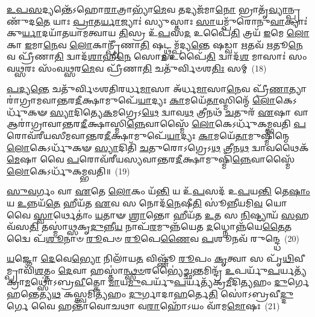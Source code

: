 \-\ul{𑌉}\-\-\ul{𑌪}\-\-\ul{𑌸}\-𑌦𑍍𑌯𑌨𑍍𑌤𑍇᳴\-𑌽𑌹𑍋\-\ul{𑌰𑌾}\-𑌤𑍍𑌰𑌾𑌭𑍍𑌯𑌾᳴\-\ul{𑌮𑍇}\-𑌵 𑌤𑌦𑍍𑌯𑌜᳴𑌮𑌾\-\ul{𑌨𑍋} 𑌭𑍍𑌰𑌾𑌤𑍃᳴\-\ul{𑌵𑍍𑌯𑌾}\-𑌨𑍍𑌪𑍍𑌰 𑌣𑍁᳴𑌦\-\ul{𑌤𑍇} 𑌯𑌾𑌃 \ul{𑌪𑍍𑌰𑌾}\-𑌤\-\ul{𑌰𑍍𑌯𑌾}\-𑌜𑍍𑌯𑌾𑌃॑ 𑌸𑍍𑌯𑍁𑌸𑍍𑌤𑌾𑌃 \ul{𑌸𑌾}\-𑌯𑌮𑍍𑌪𑍁᳴𑌰𑍋𑌨𑍁\-\ul{𑌵𑌾}\-𑌕𑍍𑌯𑌾𑌃॑ 𑌕𑍁\-\ul{𑌰𑍍𑌯𑌾}\-𑌦𑌯𑌾᳴𑌤𑌯𑌾𑌮𑌤𑍍𑌵𑌾𑌯 \ul{𑌤𑌿}\-𑌸𑍍𑌰 𑌉᳴\-\ul{𑌪}\-𑌸\-\ul{𑌦} 𑌉𑌪𑍈᳴\-\ul{𑌤𑌿} 𑌤𑍍𑌰𑌯᳴ \ul{𑌇}\-𑌮𑍇 \ul{𑌲𑍋}\-𑌕𑌾 \ul{𑌇}\-𑌮𑌾\-\ul{𑌨𑍇}\-𑌵 \ul{𑌲𑍋}\-𑌕𑌾𑌨𑍍𑌪𑍍𑌰𑍀᳴𑌣𑌾\-\ul{𑌤𑌿} 𑌷𑌟𑍍𑌥𑍍𑌸𑌮𑍍𑌪᳴𑌦𑍍𑌯\-\ul{𑌨𑍍𑌤𑍇} 𑌷𑌡𑍍𑌵𑌾 \ul{𑌋}\-𑌤𑌵᳴ \ul{𑌋}\-𑌤𑍂\-\ul{𑌨𑍇}\-𑌵 𑌪𑍍𑌰𑍀᳴𑌣𑌾\-\ul{𑌤𑌿} 𑌦𑍍𑌵𑌾𑌦᳴\-\ul{𑌶𑌾}\-𑌹𑍀\-\ul{𑌨𑍇} 𑌸𑍋\-\ul{𑌮} 𑌉𑌪𑍈᳴\-\ul{𑌤𑌿} 𑌦𑍍𑌵𑌾𑌦᳴\-\ul{𑌶} 𑌮𑌾𑌸𑌾𑌃॑ 𑌸𑌂𑌵\-\ul{𑌥𑍍𑌸}\-𑌰𑌃 𑌸𑌂᳴𑌵\-\ul{𑌥𑍍𑌸}\-𑌰\-\ul{𑌮𑍇}\-𑌵 𑌪𑍍𑌰𑍀᳴𑌣𑌾\-\ul{𑌤𑌿} 𑌚𑌤𑍁᳴𑌰𑍍𑌵𑌿𑍞𑌶\-\ul{𑌤𑌿𑌃} 𑌸𑌮𑍍~(18)

\-\ul{𑌪}\-\-\ul{𑌦𑍍𑌯}\-\-\ul{𑌨𑍍𑌤𑍇} 𑌚𑌤𑍁᳴𑌰𑍍𑌵𑌿𑍞𑌶𑌤𑌿𑌰𑌰𑍍𑌧\-\ul{𑌮𑌾}\-𑌸𑌾 𑌅᳴𑌰𑍍𑌧\-\ul{𑌮𑌾}\-𑌸𑌾\-\ul{𑌨𑍇}\-𑌵 𑌪𑍍𑌰𑍀᳴\-\ul{𑌣𑌾}\-𑌤𑍍𑌯𑌾𑌰𑌾॑𑌗𑍍𑌰𑌾𑌮𑌵𑌾𑌨𑍍𑌤𑌰\-\ul{𑌦𑍀}\-𑌕𑍍𑌷𑌾𑌮𑍁𑌪𑍇᳴\-\ul{𑌯𑌾}\-𑌦𑍍𑌯𑌃 \ul{𑌕𑌾}\-𑌮𑌯𑍇᳴\-\ul{𑌤𑌾}\-𑌸𑍍𑌮𑌿𑌨𑍍𑌮𑍇᳴ \ul{𑌲𑍋}\-𑌕𑍇\-𑌽𑌰𑍍𑌧𑍁᳴𑌕𑍟 \ul{𑌸𑍍𑌯𑌾}\-𑌦𑌿𑌤𑍍𑌯𑍇\-\ul{𑌕}\-𑌮𑌗𑍍𑌰𑍇\-𑌽\-\ul{𑌥𑍇} 𑌦𑍍𑌵𑌾𑌵\-\ul{𑌥} 𑌤𑍍𑌰𑍀𑌨𑌥᳴ \ul{𑌚}\-𑌤𑍁𑌰᳴ \ul{𑌏}\-𑌷𑌾 𑌵𑌾 𑌆𑌰𑌾॑𑌗𑍍𑌰𑌾𑌵𑌾𑌨𑍍𑌤𑌰\-\ul{𑌦𑍀}\-𑌕𑍍𑌷𑌾𑌸𑍍𑌮𑌿\-\ul{𑌨𑍍𑌨𑍇}\-𑌵𑌾𑌸𑍍𑌮𑍈᳴ \ul{𑌲𑍋}\-𑌕𑍇\-𑌽𑌰𑍍𑌧𑍁᳴𑌕𑌮𑍍𑌭𑌵𑌤𑌿 \ul{𑌪}\-𑌰𑍋𑌵᳴𑌰𑍀𑌯𑌸𑍀𑌮𑌵𑌾𑌨𑍍𑌤𑌰\-\ul{𑌦𑍀}\-𑌕𑍍𑌷𑌾𑌮𑍁𑌪𑍇᳴\-\ul{𑌯𑌾}\-𑌦𑍍𑌯𑌃 \ul{𑌕𑌾}\-𑌮𑌯𑍇᳴\-\ul{𑌤𑌾}\-𑌮𑍁𑌷𑍍𑌮𑌿᳴𑌨𑍍𑌮𑍇 \ul{𑌲𑍋}\-𑌕𑍇\-𑌽𑌰𑍍𑌧𑍁᳴𑌕𑍟 \ul{𑌸𑍍𑌯𑌾}\-𑌦𑌿𑌤𑌿᳴ \ul{𑌚}\-𑌤𑍁𑌰𑍋\-𑌽𑌗𑍍𑌰𑍇\-𑌽\-\ul{𑌥} 𑌤𑍍𑌰𑍀𑌨\-\ul{𑌥} 𑌦𑍍𑌵𑌾𑌵𑌥𑍈𑌕᳴\-\ul{𑌮𑍇}\-𑌷𑌾 𑌵𑍈 \ul{𑌪}\-𑌰𑍋𑌵᳴𑌰𑍀𑌯𑌸𑍍𑌯𑌵𑌾𑌨𑍍𑌤𑌰\-\ul{𑌦𑍀}\-𑌕𑍍𑌷𑌾𑌮𑍁𑌷𑍍𑌮𑌿᳴\-\ul{𑌨𑍍𑌨𑍇}\-𑌵𑌾𑌸𑍍𑌮𑍈᳴ \ul{𑌲𑍋}\-𑌕𑍇\-𑌽𑌰𑍍𑌧𑍁᳴𑌕𑌮𑍍𑌭𑌵𑌤𑌿॥~(19)

{\anuvakamend[{\-\ul{𑌅}\-\-\ul{𑌸𑌿}\-\-\ul{𑌷𑍍𑌯}\-𑌤𑍀𑌤𑌿᳴ 𑌜𑍁\-\ul{𑌹𑍁}\-𑌯𑌾\-\ul{𑌥𑍍𑌸𑌾}\-𑌯𑌮𑍍𑌪𑍍𑌰𑌾᳴𑌤𑌰𑍁\-\ul{𑌪}\-𑌸\-\ul{𑌦}\-𑌶𑍍𑌚𑌤𑍁᳴𑌰𑍍𑌵𑌿𑍞𑌶\-\ul{𑌤𑌿𑌃} 𑌸\-\ul{𑌞𑍍𑌚}\-𑌤𑍁𑌰𑍋\-𑌽\-\ul{𑌗𑍍𑌰𑍇} 𑌷𑍋𑌡᳴𑌶 𑌚}]}%

\-\ul{𑌸𑍁}\-\-\ul{𑌵}\-𑌰𑍍𑌗𑌂 𑌵𑌾 \ul{𑌏}\-𑌤𑍇 \ul{𑌲𑍋}\-𑌕𑌂 𑌯᳴\-\ul{𑌨𑍍𑌤𑌿} 𑌯 𑌉᳴\-\ul{𑌪}\-𑌸𑌦᳴ 𑌉\-\ul{𑌪}\-𑌯\-\ul{𑌨𑍍𑌤𑌿} 𑌤𑍇\-\ul{𑌷𑌾𑌂} 𑌯 \ul{𑌉}\-𑌨𑍍𑌨𑌯᳴\-\ul{𑌤𑍇} 𑌹𑍀𑌯᳴𑌤 \ul{𑌏}\-𑌵 𑌸 𑌨𑍋𑌦᳴\-\ul{𑌨𑍇}\-𑌷𑍀\-\ul{𑌤𑌿} 𑌸𑍂॑𑌨𑍍𑌨𑍀𑌯𑌮𑌿\-\ul{𑌵} 𑌯𑍋 𑌵𑍈 \ul{𑌸𑍍𑌵𑌾}\-𑌰𑍍𑌥𑍇𑌤𑌾॑𑌂 \ul{𑌯}\-𑌤𑌾𑍟 \ul{𑌶𑍍𑌰𑌾}\-𑌨𑍍𑌤𑍋 𑌹𑍀𑌯᳴𑌤 \ul{𑌉}\-𑌤 𑌸 \ul{𑌨𑌿}\-𑌷𑍍𑌟𑍍𑌯𑌾𑌯᳴ \ul{𑌸}\-𑌹 𑌵᳴𑌸\-\ul{𑌤𑌿} 𑌤𑌸𑍍𑌮𑌾॑\-\ul{𑌥𑍍𑌸}\-𑌕𑍃\-\ul{𑌦𑍁}\-𑌨𑍍𑌨𑍀\-\ul{𑌯} 𑌨𑌾𑌪᳴\-\ul{𑌰}\-𑌮𑍁𑌨𑍍𑌨᳴𑌯𑍇𑌤 \ul{𑌦}\-𑌧𑍍𑌨𑍋𑌨𑍍𑌨᳴𑌯𑍇\-\ul{𑌤𑍈}\-𑌤𑌦𑍍𑌵𑍈 𑌪᳴\-\ul{𑌶𑍂}\-𑌨𑌾𑍞 \ul{𑌰𑍂}\-𑌪𑍞 \ul{𑌰𑍂}\-𑌪𑍇\-\ul{𑌣𑍈}\-𑌵 \ul{𑌪}\-𑌶𑍂𑌨𑌵᳴ 𑌰𑍁𑌨𑍍𑌦𑍍𑌧𑍇~(20)

\-\ul{𑌯}\-𑌜𑍍𑌞𑍋 \ul{𑌦𑍇}\-𑌵𑍇\-\ul{𑌭𑍍𑌯𑍋} 𑌨𑌿𑌲𑌾᳴𑌯\-\ul{𑌤} 𑌵𑌿𑌷𑍍𑌣𑍂᳴ \ul{𑌰𑍂}\-𑌪𑌂 \ul{𑌕𑍃}\-𑌤𑍍𑌵𑌾 𑌸 𑌪𑍃᳴\-\ul{𑌥𑌿}\-𑌵𑍀𑌮𑍍𑌪𑍍𑌰𑌾𑌵𑌿᳴\-\ul{𑌶}\-𑌤𑍍𑌤𑌂 \ul{𑌦𑍇}\-𑌵𑌾 𑌹𑌸𑍍𑌤𑌾॑\-\ul{𑌨𑍍𑌥𑍍𑌸}\-\-\ul{𑍞}\-𑌰𑌭𑍍𑌯𑍈॑\-\ul{𑌚𑍍𑌛}\-𑌨𑍍𑌤𑌮𑌿𑌨𑍍𑌦𑍍𑌰᳴ \ul{𑌉}\-𑌪𑌰𑍍𑌯𑍁᳴\-\ul{𑌪}\-𑌰𑍍𑌯𑌤𑍍𑌯᳴𑌕𑍍𑌰𑌾\-\ul{𑌮}\-𑌥𑍍𑌸𑍋॑\-𑌽𑌬𑍍𑌰\-\ul{𑌵𑍀}\-𑌤𑍍𑌕𑍋 \ul{𑌮𑌾}\-𑌯\-\ul{𑌮𑍁}\-𑌪𑌰𑍍𑌯𑍁᳴\-\ul{𑌪}\-𑌰𑍍𑌯𑌤𑍍𑌯᳴𑌕𑍍𑌰\-\ul{𑌮𑍀}\-𑌦𑌿\-\ul{𑌤𑍍𑌯}\-𑌹𑌂 \ul{𑌦𑍁}\-𑌰𑍍𑌗𑍇 𑌹𑌨𑍍𑌤𑍇𑌤𑍍𑌯\-\ul{𑌥} 𑌕𑌸𑍍𑌤𑍍𑌵𑌮𑌿\-\ul{𑌤𑍍𑌯}\-𑌹𑌂 \ul{𑌦𑍁}\-𑌰𑍍𑌗𑌾𑌦𑌾\-\ul{𑌹}\-𑌰𑍍𑌤𑍇\-\ul{𑌤𑌿} 𑌸𑍋॑\-𑌽𑌬𑍍𑌰𑌵𑍀\-\ul{𑌦𑍍𑌦𑍁}\-𑌰𑍍𑌗𑍇 𑌵𑍈 𑌹𑌨𑍍𑌤𑌾᳴𑌵𑍋𑌚𑌥𑌾 𑌵\-\ul{𑌰𑌾}\-𑌹𑍋᳴\-𑌽𑌯𑌂 𑌵𑌾᳴𑌮\-\ul{𑌮𑍋}\-𑌷𑌃~(21)

